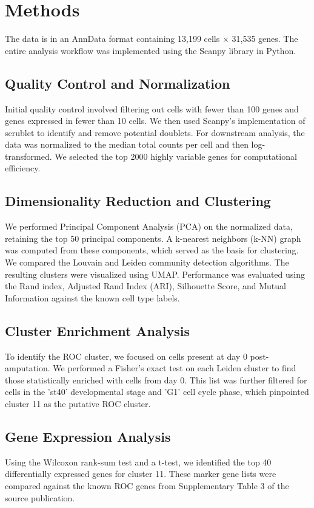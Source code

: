 \documentclass[12pt,letterpaper]{article}
\begin{document}
\section{Methods}
The data is in an AnnData format containing 13,199 cells × 31,535 genes. The entire analysis workflow was implemented using the Scanpy library in Python.

\subsection{Quality Control and Normalization}
Initial quality control involved filtering out cells with fewer than 100 genes and genes expressed in fewer than 10 cells. We then used Scanpy's implementation of scrublet to identify and remove potential doublets. For downstream analysis, the data was normalized to the median total counts per cell and then log-transformed. We selected the top 2000 highly variable genes for computational efficiency.

\subsection{Dimensionality Reduction and Clustering}
We performed Principal Component Analysis (PCA) on the normalized data, retaining the top 50 principal components. A k-nearest neighbors (k-NN) graph was computed from these components, which served as the basis for clustering. We compared the Louvain and Leiden community detection algorithms. The resulting clusters were visualized using UMAP. Performance was evaluated using the Rand index, Adjusted Rand Index (ARI), Silhouette Score, and Mutual Information against the known cell type labels.

\subsection{Cluster Enrichment Analysis}
To identify the ROC cluster, we focused on cells present at day 0 post-amputation. We performed a Fisher's exact test on each Leiden cluster to find those statistically enriched with cells from day 0. This list was further filtered for cells in the 'st40' developmental stage and 'G1' cell cycle phase, which pinpointed cluster 11 as the putative ROC cluster.

\subsection{Gene Expression Analysis}
Using the Wilcoxon rank-sum test and a t-test, we identified the top 40 differentially expressed genes for cluster 11. These marker gene lists were compared against the known ROC genes from Supplementary Table 3 of the source publication.
\end{document}
